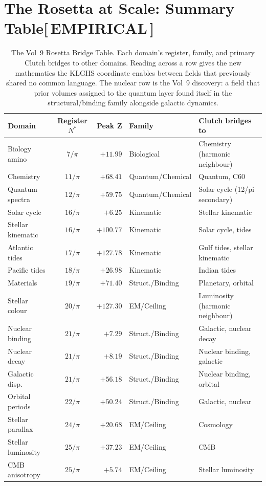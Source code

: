 \documentclass[12pt,oneside]{book}
\newcommand{\EmpiricalTag}{\;\colorbox{empiricaltag!15}{\textcolor{empiricaltag}{\footnotesize\bfseries [\,EMPIRICAL\,]}}}
\begin{document}
\vspace{1em}

\section{The Rosetta at Scale: Summary Table\EmpiricalTag}

\begin{table}[H]
\centering
\renewcommand{\arraystretch}{1.4}
\small
\begin{tabular}{|l|c|r|l|l|}
\hline
\rowcolor{blue!10}
\textbf{Domain} & \textbf{Register $N^*$} & \textbf{Peak Z} & \textbf{Family} & \textbf{Clutch bridges to} \\
\hline\hline
Biology amino    & $7/\pi$  & $+11.99$ & Biological & Chemistry (harmonic neighbour) \\
Chemistry        & $11/\pi$ & $+68.41$ & Quantum/Chemical & Quantum, C60 \\
Quantum spectra  & $12/\pi$ & $+59.75$ & Quantum/Chemical & Solar cycle (12/pi secondary) \\
Solar cycle      & $16/\pi$ & $+6.25$  & Kinematic & Stellar kinematic \\
Stellar kinematic & $16/\pi$ & $+100.77$ & Kinematic & Solar cycle, tides \\
Atlantic tides   & $17/\pi$ & $+127.78$ & Kinematic & Gulf tides, stellar kinematic \\
Pacific tides    & $18/\pi$ & $+26.98$  & Kinematic & Indian tides \\
Materials        & $19/\pi$ & $+71.40$  & Struct./Binding & Planetary, orbital \\
Stellar colour   & $20/\pi$ & $+127.30$ & EM/Ceiling & Luminosity (harmonic neighbour) \\
Nuclear binding  & $21/\pi$ & $+7.29$   & Struct./Binding & Galactic, nuclear decay \\
Nuclear decay    & $21/\pi$ & $+8.19$   & Struct./Binding & Nuclear binding, galactic \\
Galactic disp.   & $21/\pi$ & $+56.18$  & Struct./Binding & Nuclear binding, orbital \\
Orbital periods  & $22/\pi$ & $+50.24$  & Struct./Binding & Galactic, nuclear \\
Stellar parallax & $24/\pi$ & $+20.68$  & EM/Ceiling & Cosmology \\
Stellar luminosity & $25/\pi$ & $+37.23$ & EM/Ceiling & CMB \\
CMB anisotropy   & $25/\pi$ & $+5.74$   & EM/Ceiling & Stellar luminosity \\
\hline
\end{tabular}
\caption{The Vol~9 Rosetta Bridge Table. Each domain's register, family, and primary
Clutch bridges to other domains. Reading across a row gives the new mathematics the
KLGHS coordinate enables between fields that previously shared no common language.
The nuclear row is the Vol~9 discovery: a field that prior volumes assigned to the
quantum layer found itself in the structural/binding family alongside galactic dynamics.}
\label{tab:rosetta_bridge}
\end{table}
\end{document}

